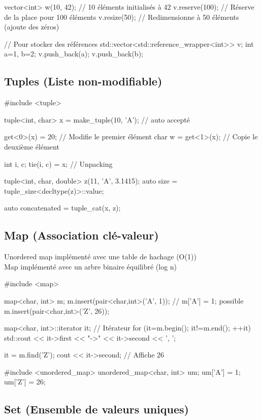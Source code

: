 \documentclass{article}
\begin{document}
\begin{multicols*}{4}
\begin{cppcode}
vector<int> w(10, 42); // 10 éléments initialisés à 42
v.reserve(100); // Réserve de la place pour 100 éléments
v.resize(50);  // Redimensionne à 50 éléments (ajoute des zéros)

// Pour stocker des références
std::vector<std::reference_wrapper<int>> v;
int a=1, b=2; v.push_back(a); v.push_back(b);
\end{cppcode}

\subsection*{Tuples (Liste non-modifiable)}

\begin{cppcode}
#include <tuple>

tuple<int, char> x = make_tuple(10, 'A'); // auto accepté

get<0>(x) = 20; // Modifie le premier élément
char w = get<1>(x); // Copie le deuxième élément

int i, c;
tie(i, c) = x; // Unpacking

tuple<int, char, double> z(11, 'A', 3.1415);
auto size = tuple_size<decltype(z)>::value;

auto concatenated = tuple_cat(x, z);
\end{cppcode}

\subsection*{Map (Association clé-valeur)}
Unordered map implémenté avec une table de hachage (O(1))\\
Map implémenté avec un arbre binaire équilibré (log n)
\begin{cppcode}
#include <map>

map<char, int> m;
m.insert(pair<char,int>('A', 1)); // m['A'] = 1; possible
m.insert(pair<char,int>('Z', 26));

map<char, int>::iterator it; // Itérateur
for (it=m.begin(); it!=m.end(); ++it)
    std::cout << it->first << "->" << it->second << ', ';

it = m.find('Z');
cout << it->second; // Affiche 26

#include <unordered_map>
unordered_map<char, int> um;
um['A'] = 1; um['Z'] = 26;
\end{cppcode}

\subsection*{Set (Ensemble de valeurs uniques)}


\end{multicols*}
\end{document}
